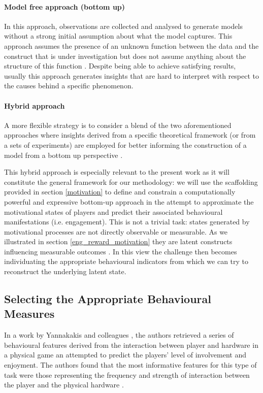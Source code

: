 \paragraph*{Model free approach (bottom up)} In this approach, observations are collected and analysed to generate models without a strong initial assumption about what the model captures. This approach assumes the presence of an unknown function between the data and the construct that is under investigation but does not assume anything about the structure of this function \cite{yannakakis2013player}. Despite being able to achieve satisfying results, usually this approach generates insights that are hard to interpret with respect to the causes behind a specific phenomenon.

\paragraph*{Hybrid approach} A more flexible strategy is to consider a blend of the two aforementioned approaches where insights derived from a specific theoretical framework (or from a sets of experiments) are employed for better informing the construction of a model from a bottom up perspective \cite{yannakakis2013player}. 

This hybrid approach is especially relevant to the present work as it will constitute the general framework for our methodology: we will use the scaffolding provided in section \ref{motivation} to define and constrain a computationally powerful and expressive bottom-up approach in the attempt to approximate the motivational states of players and predict their associated behavioural manifestations (i.e. engagement). This is not a trivial task: 
states generated by motivational processes are not directly observable or measurable. As we illustrated in section \ref{eng_reward_motivation} they are latent constructs influencing measurable outcomes \cite{yannakakis2007game, bauckhage2012players}. In this view the challenge then becomes individuating the appropriate behavioural indicators from which we can try to reconstruct the underlying latent state. 

\subsection{Selecting the Appropriate Behavioural Measures} In a work by Yannakakis and colleagues \cite{yannakakis2007game}, the authors retrieved a series of behavioural features derived from the interaction between player and hardware in a physical game an attempted to predict the players' level of involvement and enjoyment. The authors found that the most informative features for this type of task were those representing the frequency and strength of interaction between the player and the physical hardware \cite{yannakakis2007game}. 

